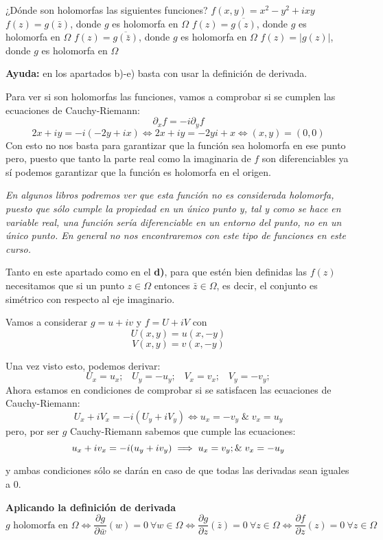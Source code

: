 \begin{problem}[7]
¿Dónde son holomorfas las siguientes funciones?
\ppart $f(x,y)=x^2-y^2+ixy$
\ppart $f(z)=g(\bar{z})$, donde $g$ es holomorfa en $\Omega$
\ppart $f(z)=\overline{g(z)}$, donde $g$ es holomorfa en $\Omega$
\ppart $f(z)=\overline{g(\bar{z})}$, donde $g$ es holomorfa en $\Omega$
\ppart $f(z)=|g(z)|$, donde $g$ es holomorfa en $\Omega$

\textbf{Ayuda:} en los apartados b)-e) basta con usar la definición de derivada.

\solution

Para ver si son holomorfas las funciones, vamos a comprobar si se cumplen las ecuaciones de Cauchy-Riemann:
\[\partial_x f = -i \partial_y f\]
\spart
\[2x+iy=-i\left( -2y +ix\right) \iff 2x+iy = -2yi+x \iff (x,y)=(0,0)\]
Con esto no nos basta para garantizar que la función sea holomorfa en ese punto pero, puesto que tanto la parte real como la imaginaria de $f$ son diferenciables ya sí podemos garantizar que la función es holomorfa en el origen.

\textit{En algunos libros podremos ver que esta función no es considerada holomorfa, puesto que sólo cumple la propiedad en un único punto y, tal y como se hace en variable real, una función sería diferenciable en un entorno del punto, no en un único punto. En general no nos encontraremos con este tipo de funciones en este curso.}

\spart
Tanto en este apartado como en el \textbf{d)}, para que estén bien definidas las $f(z)$ necesitamos que si un punto $z\in Ω$ entonces $\bar{z} \in Ω$, es decir, el conjunto es simétrico con respecto al eje imaginario.

Vamos a considerar $g=u+iv$ y $f=U+iV$ con
\[U(x,y)=u(x,-y)\]
\[V(x,y)=v(x,-y)\]

Una vez visto esto, podemos derivar:
\[U_x = u_x; \;\;\; U_y=-u_y; \;\;\; V_x=v_x; \; \; \; V_y=-v_y;\]
Ahora estamos en condiciones de comprobar si se satisfacen las ecuaciones de Cauchy-Riemann:
\[U_x+iV_x=-i\left(U_y+iV_y\right) \iff u_x = -v_y\; \& \; v_x=u_y\]
pero, por ser $g$ Cauchy-Riemann sabemos que cumple las ecuaciones:
\[u_x+iv_x=-i(u_y+iv_y) \implies u_x=v_y\\; \& \; v_x=-u_y\]

y ambas condiciones sólo se darán en caso de que todas las derivadas sean iguales a 0.

\textbf{Aplicando la definición de derivada}
\[g \text{ holomorfa en }Ω \iff \frac{\partial g}{\partial \bar{w}}(w)=0\ \forall w \in Ω \iff \frac{\partial g}{\partial z}(\bar{z})=0 \ \forall z \in Ω \iff \frac{\partial f}{\partial z}(z)=0 \ \forall z \in Ω\]


\end{problem}

